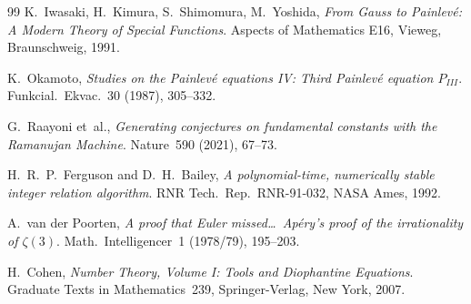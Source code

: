 \documentclass[11pt,a4paper]{article}
\theoremstyle{definition}
\theoremstyle{remark}
\begin{document}
\begin{thebibliography}{99}
K.~Iwasaki, H.~Kimura, S.~Shimomura, M.~Yoshida,
\emph{From Gauss to Painlev\'e: A Modern Theory of Special Functions}.
Aspects of Mathematics E16, Vieweg, Braunschweig, 1991.

K.~Okamoto, \emph{Studies on the Painlev\'e equations IV: Third
Painlev\'e equation $P_{III}$}. Funkcial.~Ekvac.~30 (1987), 305--332.

G.~Raayoni et~al., \emph{Generating conjectures on fundamental constants
with the Ramanujan Machine}.
Nature~590 (2021), 67--73.

H.~R.~P.~Ferguson and D.~H.~Bailey, \emph{A polynomial-time, numerically
stable integer relation algorithm}. RNR Tech.\ Rep.\ RNR-91-032, NASA
Ames, 1992.

A.~van der Poorten, \emph{A proof that Euler missed\ldots\ Ap\'ery's proof
of the irrationality of $\zeta(3)$}. Math.~Intelligencer~1 (1978/79),
195--203.

H.~Cohen, \emph{Number Theory, Volume I: Tools and Diophantine
Equations}. Graduate Texts in Mathematics~239, Springer-Verlag, New
York, 2007.

\end{thebibliography}
\end{document}
